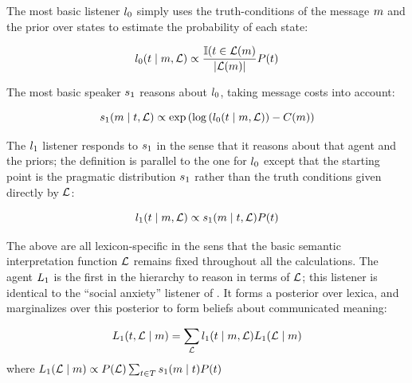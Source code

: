 The most basic listener $\listenerZero$ simply uses the
truth-conditions of the message $m$ and the prior over states to
estimate the probability of each state:

\begin{definition}[$\listenerZero$]\label{def:l0}
  \[
  l_{0}(t \mid m, \mathcal{L}) 
  \propto
  \frac{\mathbb{I}(t \in \mathcal{L}(m)}{|\mathcal{L}(m)|}
  P(t)
  \]
\end{definition}

The most basic speaker $\speakerOne$ reasons about $\listenerZero$,
taking message costs into account:

\begin{definition}[$\speakerOne$]\label{def:s1}  
  \[
  s_{1}(m \mid t, \mathcal{L}) 
  \propto
  \exp
  \left(
    \log
    \left(l_{0}(t \mid m, \mathcal{L})\right) 
    - C(m)
  \right)
  \]
\end{definition}

The $\listenerOne$ listener responds to $\speakerOne$ in the sense
that it reasons about that agent and the priors; the definition is
parallel to the one for $\listenerZero$ except that the starting point
is the pragmatic distribution $\speakerOne$ rather than the truth
conditions given directly by $\mathcal{L}$:

\begin{definition}[$\listenerOne$]\label{def:l1}
  \[
  l_{1}(t \mid m, \mathcal{L}) 
  \propto 
  s_{1}(m \mid t, \mathcal{L})P(t)
  \]
\end{definition}

The above are all lexicon-specific in the sens that the basic semantic
interpretation function $\mathcal{L}$ remains fixed throughout all the
calculations.  The agent $\ListenerOne$ is the first in the hierarchy
to reason in terms of $\mathcal{L}$; this listener is identical to the
``social anxiety'' listener of \cite{Smith:Goodman:Frank:2013}. It
forms a posterior over lexica, and marginalizes over this posterior to
form beliefs about communicated meaning:

\begin{definition}[$\ListenerOne$]\label{def:l1}
  \[
  L_{1}(t, \mathcal{L} \mid m) 
  = 
  \sum_{\mathcal{L}} l_{1}(t \mid m, \mathcal{L}) L_{1}(\mathcal{L} \mid m) 
  \]
  where
  $L_{1}(\mathcal{L} \mid m) \propto P(\mathcal{L}) \sum_{t\in T} s_{1}(m \mid t)P(t)$
\end{definition}

